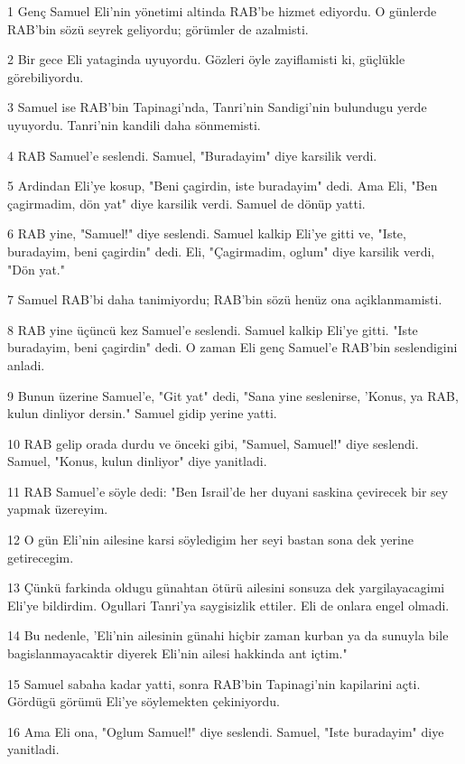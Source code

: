 \par 1 Genç Samuel Eli'nin yönetimi altinda RAB'be hizmet ediyordu. O günlerde RAB'bin sözü seyrek geliyordu; görümler de azalmisti.
\par 2 Bir gece Eli yataginda uyuyordu. Gözleri öyle zayiflamisti ki, güçlükle görebiliyordu.
\par 3 Samuel ise RAB'bin Tapinagi'nda, Tanri'nin Sandigi'nin bulundugu yerde uyuyordu. Tanri'nin kandili daha sönmemisti.
\par 4 RAB Samuel'e seslendi. Samuel, "Buradayim" diye karsilik verdi.
\par 5 Ardindan Eli'ye kosup, "Beni çagirdin, iste buradayim" dedi. Ama Eli, "Ben çagirmadim, dön yat" diye karsilik verdi. Samuel de dönüp yatti.
\par 6 RAB yine, "Samuel!" diye seslendi. Samuel kalkip Eli'ye gitti ve, "Iste, buradayim, beni çagirdin" dedi. Eli, "Çagirmadim, oglum" diye karsilik verdi, "Dön yat."
\par 7 Samuel RAB'bi daha tanimiyordu; RAB'bin sözü henüz ona açiklanmamisti.
\par 8 RAB yine üçüncü kez Samuel'e seslendi. Samuel kalkip Eli'ye gitti. "Iste buradayim, beni çagirdin" dedi. O zaman Eli genç Samuel'e RAB'bin seslendigini anladi.
\par 9 Bunun üzerine Samuel'e, "Git yat" dedi, "Sana yine seslenirse, 'Konus, ya RAB, kulun dinliyor dersin." Samuel gidip yerine yatti.
\par 10 RAB gelip orada durdu ve önceki gibi, "Samuel, Samuel!" diye seslendi. Samuel, "Konus, kulun dinliyor" diye yanitladi.
\par 11 RAB Samuel'e söyle dedi: "Ben Israil'de her duyani saskina çevirecek bir sey yapmak üzereyim.
\par 12 O gün Eli'nin ailesine karsi söyledigim her seyi bastan sona dek yerine getirecegim.
\par 13 Çünkü farkinda oldugu günahtan ötürü ailesini sonsuza dek yargilayacagimi Eli'ye bildirdim. Ogullari Tanri'ya saygisizlik ettiler. Eli de onlara engel olmadi.
\par 14 Bu nedenle, 'Eli'nin ailesinin günahi hiçbir zaman kurban ya da sunuyla bile bagislanmayacaktir diyerek Eli'nin ailesi hakkinda ant içtim."
\par 15 Samuel sabaha kadar yatti, sonra RAB'bin Tapinagi'nin kapilarini açti. Gördügü görümü Eli'ye söylemekten çekiniyordu.
\par 16 Ama Eli ona, "Oglum Samuel!" diye seslendi. Samuel, "Iste buradayim" diye yanitladi.
